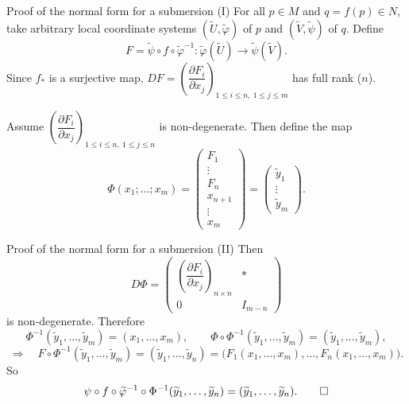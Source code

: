 \documentclass[10pt]{beamer}
\begin{document}
\begin{frame}{Proof of the normal form for a submersion (I)}
	For all $p \in M$ and $q = f(p) \in N$, take arbitrary local
	coordinate systems $(\widetilde{U}, \widetilde{\varphi})$ of $p$
	and $(\widetilde{V}, \widetilde{\psi})$ of $q$. Define
	\[
		F = \widetilde{\psi} \circ f \circ \widetilde{\varphi}^{-1}
		: \widetilde{\varphi}(\widetilde{U})
		\longrightarrow \widetilde{\psi}(\widetilde{V}).
	\]
	Since $f_*$ is a surjective map,
	$DF = \left( \dfrac{\partial F_i}{\partial x_j}
		\right)_{1 \le i \le n,\ 1 \le j \le m}$ has full rank ($n$).
	\medskip

	Assume $\left( \dfrac{\partial F_i}{\partial x_j}
		\right)_{1 \le i \le n,\ 1 \le j \le n}$ is non-degenerate.
	Then define the map
	\[
		\Phi(x_1; \dots; x_m) =
		\begin{pmatrix}
			F_1 \\ \vdots \\ F_n \\ x_{n+1} \\ \vdots \\ x_m
		\end{pmatrix}
		=
		\begin{pmatrix}\widetilde{y}_1 \\ \vdots \\ \widetilde{y}_m
		\end{pmatrix}.
	\]
\end{frame}

\begin{frame}{Proof of the normal form for a submersion (II)}
	Then
	\[
		D\Phi =
		\begin{pmatrix}
			\left( \dfrac{\partial F_i}{\partial x_j} \right)_{n \times n} & *       \\
			0                                                              & I_{m-n}
		\end{pmatrix}
	\]
	is non-degenerate. Therefore
	\[
		\Phi^{-1}(\widetilde{y}_1, \dots, \widetilde{y}_m)
		= (x_1, \dots, x_m), \qquad
		\Phi \circ \Phi^{-1}(\widetilde{y}_1, \dots, \widetilde{y}_m)
		= (\widetilde{y}_1, \dots, \widetilde{y}_m),
	\]
	\[
		\Longrightarrow\quad
		F \circ \Phi^{-1}(\widetilde{y}_1, \dots, \widetilde{y}_m)
		= (\widetilde{y}_1, \dots, \widetilde{y}_n)
		= \bigl( F_1(x_1, \dots, x_m), \dots, F_n(x_1, \dots, x_m)
		\bigr).
	\]
	So
	\[
		\psi \circ f \circ \widetilde{\varphi}^{-1} \circ
		\Phi^{-1}(\widetilde{y}_1, \dots, \widetilde{y}_n)
		= (\widetilde{y}_1, \dots, \widetilde{y}_n). \qedhere
	\]
\end{frame}
\end{document}
